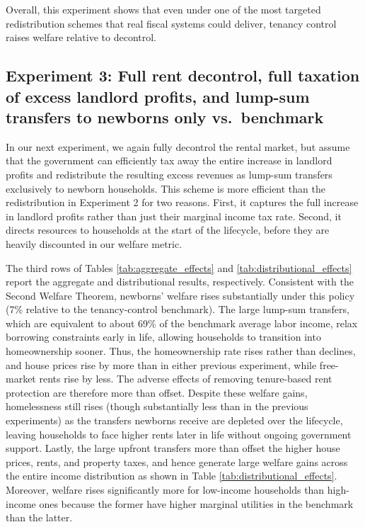 \documentclass[parskip=full]{article}
\begin{document}
Overall, this experiment shows that even under one of the most targeted redistribution schemes that real fiscal systems could deliver, tenancy control raises welfare relative to decontrol.

\subsection{Experiment 3: Full rent decontrol, full taxation of excess landlord profits, and lump-sum transfers to newborns only vs.\ benchmark}\label{sec:exp_3}

In our next experiment, we again fully decontrol the rental market, but assume that the government can efficiently tax away the entire increase in landlord profits and redistribute the resulting excess revenues as lump-sum transfers exclusively to newborn households. This scheme is more efficient than the redistribution in Experiment 2 for two reasons. First, it captures the full increase in landlord profits rather than just their marginal income tax rate. Second, it directs resources to households at the start of the lifecycle, before they are heavily discounted in our welfare metric. 

The third rows of Tables \ref{tab:aggregate_effects} and \ref{tab:distributional_effects} report the aggregate and distributional results, respectively. Consistent with the Second Welfare Theorem, newborns' welfare rises substantially under this policy (7\% relative to the tenancy-control benchmark). The large lump-sum transfers, which are equivalent to about 69\% of the benchmark average labor income, relax borrowing constraints early in life, allowing households to transition into homeownership sooner. Thus, the homeownership rate rises rather than declines, and house prices rise by more than in either previous experiment, while free-market rents rise by less. The adverse effects of removing tenure-based rent protection are therefore more than offset. Despite these welfare gains, homelessness still rises (though substantially less than in the previous experiments) as the transfers newborns receive are depleted over the lifecycle, leaving households to face higher rents later in life without ongoing government support. Lastly, the large upfront transfers more than offset the higher house prices, rents, and property taxes, and hence generate large welfare gains across the entire income distribution as shown in Table \ref{tab:distributional_effects}. Moreover, welfare rises significantly more for low-income households than high-income ones because the former have higher marginal utilities in the benchmark than the latter.
\end{document}
